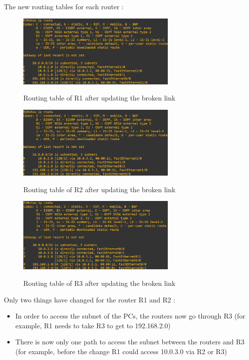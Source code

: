 \documentclass[10pt,a4paper]{ULBreport}
\begin{document}


The new routing tables for each router :

\begin{figure}[H]
    \caption{Routing table of R1 after updating the broken link}
    \center
    \includegraphics[width=0.7\textwidth]{routeR1down.png}
    \label{routedown1}
\end{figure}

\begin{figure}[H]
    \caption{Routing table of R2 after updating the broken link}
    \center
    \includegraphics[width=0.7\textwidth]{routeR2down.png}
    \label{routedown2}
\end{figure}

\begin{figure}[H]
    \caption{Routing table of R3 after updating the broken link}
    \center
    \includegraphics[width=0.7\textwidth]{routeR3dowb.png}
    \label{routedown3}
\end{figure}

Only two things have changed for the router R1 and R2 :

\begin{itemize}
    \item In order to access the subnet of the PCs, the routers now go through R3 (for example, R1 needs to take R3 to get to 192.168.2.0)
    \item There is now only one path to access the subnet between the routers and R3 (for example, before the change R1 could access 10.0.3.0 via R2 or R3)  
\end{itemize}
\end{document}
